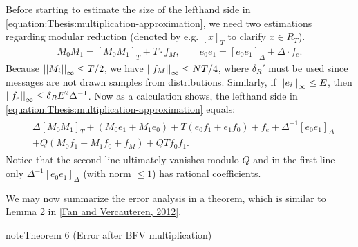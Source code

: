 \documentclass[letterpaper,10pt,english]{jupyterBook}
\begin{document}
\sphinxAtStartPar
Before starting to estimate the size of the left\sphinxhyphen{}hand side in \eqref{equation:Thesis:multiplication-approximation}, we need two estimations regarding modular reduction (denoted by e.g. \([x]_T\) to clarify \(x \in R_T\)).
\begin{equation*}
\begin{split}M_0M_1 = [M_0M_1]_T + T \cdot f_M, \qquad e_0e_1 = [e_0e_1]_\Delta + \Delta \cdot f_e.\end{split}
\end{equation*}
\sphinxAtStartPar
Because \(\left\lvert\left\lvert M_i \right\rvert\right\rvert_\infty \le T/2\), we have \(\left\lvert\left\lvert f_M \right\rvert\right\rvert_\infty \le NT/4\), where \(\delta_R'\) must be used since messages are not drawn samples from distributions.
Similarly, if \(\left\lvert\left\lvert e_i \right\rvert\right\rvert_\infty \le E\), then \(\left\lvert\left\lvert f_e \right\rvert\right\rvert_\infty \le \delta_R E^2\Delta^{-1}\).
Now as a calculation shows, the left\sphinxhyphen{}hand side in \eqref{equation:Thesis:multiplication-approximation} equals:
\begin{equation}\label{equation:Thesis:estimation-of-multiplication}
\begin{split}\begin{split}
&\Delta[M_0M_1]_T + (M_0e_1+M_1e_0) + T(e_0f_1+e_1f_0) + f_e + \Delta^{-1}[e_0e_1]_\Delta \\
&+ Q(M_0f_1+M_1f_0+f_M) + QTf_0f_1.
\end{split}\end{split}
\end{equation}
\sphinxAtStartPar
Notice that the second line ultimately vanishes modulo \(Q\) and in the first line only \(\Delta^{-1}[e_0e_1]_\Delta\) (with norm \(\le 1\)) has rational coefficients.

\sphinxAtStartPar
We may now summarize the error analysis in a theorem, which is similar to Lemma 2 in {[}\hyperlink{cite.Thesis:id70}{Fan and Vercauteren, 2012}{]}.
\label{Thesis:error-after-BFV-multiplication}
\begin{sphinxadmonition}{note}{Theorem 6 (Error after BFV multiplication)}
\end{sphinxadmonition}
\end{document}
